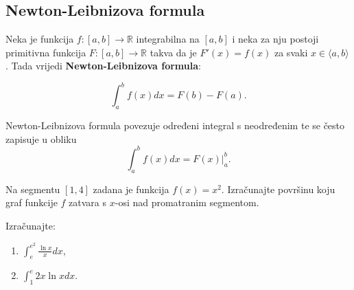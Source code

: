 \subsection{Newton-Leibnizova formula}

Neka je funkcija $f: [a,b] \to \mathbb{R}$ integrabilna na $[a,b]$ i neka za nju postoji primitivna funkcija $F: [a,b] \to \mathbb{R}$ takva da je $F'(x)=f(x)$ za svaki $x\in \langle a, b \rangle$. Tada vrijedi \textbf{Newton-Leibnizova formula}:

$$
  \int_a^b f(x)dx=F(b)-F(a).
$$

Newton-Leibnizova formula povezuje određeni integral s neodređenim te se često zapisuje u obliku
$$
  \int_a^b f(x)dx=F(x)\Big|_a^b.
$$

\begin{example}
    Na segmentu $[1,4]$ zadana je funkcija $f(x)=x^2$.
    Izračunajte površinu koju graf funkcije $f$ zatvara s $x$-osi nad promatranim segmentom.
\end{example}


\begin{example}
    Izračunajte:

    \begin{enumerate}
        \item $\displaystyle \int_e^{e^2} \frac{\ln x}{x} dx$,
        \item $\displaystyle \int_1^{e} 2x \ln x dx$.
    \end{enumerate}
\end{example}
